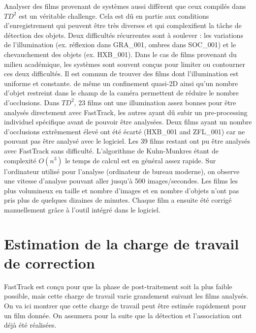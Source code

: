   Analyser des films provenant de systèmes aussi diffèrent que ceux compilés dans $TD^2$ est un véritable challenge. Cela est dû en partie aux conditions d'enregistrement qui peuvent être très diverses et qui complexifient la tâche de détection des objets. Deux difficultés récurrentes sont à soulever : les variations de l'illumination (ex. réflexion dans GRA\_001, ombres dans SOC\_001) et le chevauchement des objets (ex. HXB\_001).
  Dans le cas de films provenant du milieu académique, les systèmes sont souvent conçus pour limiter ou contourner ces deux difficultés. Il est commun de trouver des films dont l'illumination est uniforme et constante. de même un confinement quasi-2D ainsi qu'un nombre d'objet restreint dans le champ de la caméra permettent de réduire le nombre d'occlusions.
  Dans $TD^2$, 23 films ont une illumination assez bonnes pour être analysés directement avec FastTrack, les autres ayant dû subir un pre-processing individuel spécifique avant de pouvoir être analysées. Deux films ayant un nombre d'occlusions extrêmement élevé ont été écarté (HXB\_001 and ZFL\_001) car ne pouvant pas être analysé avec le logiciel.
  Les 39 films restant ont pu être analysés avec FastTrack sans difficulté. L'algorithme de Kuhn-Munkres étant de complexité $O(n^3)$ le temps de calcul est en général assez rapide. Sur l'ordinateur utilisé pour l'analyse (ordinateur de bureau moderne), on observe une vitesse d'analyse pouvant aller jusqu’à 500 images/secondes. Les films les plus volumineux en taille et nombre d'images et en nombre d'objets n'ont pas pris plus de quelques dizaines de minutes. Chaque film a ensuite été corrigé manuellement grâce à l'outil intégré dans le logiciel.
	
	\section{Estimation de la charge de travail de correction}
	
	FastTrack est conçu pour que la phase de post-traitement soit la plus faible possible, mais cette charge de travail varie grandement suivant les films analysés. On va ici montrer que cette charge de travail peut être estimée rapidement pour un film donnée. On assumera pour la suite que la détection et l'association ont déjà été réalisées.\\
	
